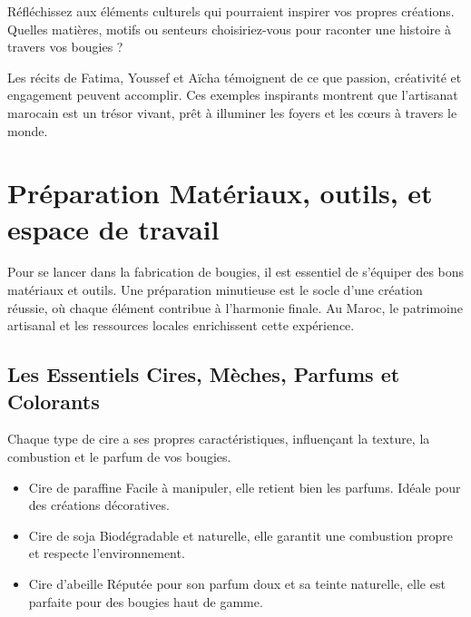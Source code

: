 \documentclass[11pt,fleqn,onecolumn,oneside]{book}
\begin{document}
\begin{exercise}
Réfléchissez aux éléments culturels qui pourraient inspirer vos propres créations. Quelles matières, motifs ou senteurs choisiriez-vous pour raconter une histoire à travers vos bougies ?
\end{exercise}

\begin{remark}
Les récits de Fatima, Youssef et Aïcha témoignent de ce que passion, créativité et engagement peuvent accomplir. Ces exemples inspirants montrent que l’artisanat marocain est un trésor vivant, prêt à illuminer les foyers et les cœurs à travers le monde.
\end{remark}

\section{Préparation Matériaux, outils, et espace de travail}

\begin{definition}
Pour se lancer dans la fabrication de bougies, il est essentiel de s’équiper des bons matériaux et outils. Une préparation minutieuse est le socle d’une création réussie, où chaque élément contribue à l’harmonie finale. Au Maroc, le patrimoine artisanal et les ressources locales enrichissent cette expérience.
\end{definition}

\subsection*{Les Essentiels Cires, Mèches, Parfums et Colorants}

\begin{remark}
Chaque type de cire a ses propres caractéristiques, influençant la texture, la combustion et le parfum de vos bougies. 
\end{remark}

\begin{itemize}
    \item Cire de paraffine Facile à manipuler, elle retient bien les parfums. Idéale pour des créations décoratives.
    \item Cire de soja Biodégradable et naturelle, elle garantit une combustion propre et respecte l’environnement.
    \item Cire d’abeille Réputée pour son parfum doux et sa teinte naturelle, elle est parfaite pour des bougies haut de gamme.
\end{itemize}
\end{document}
